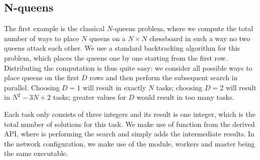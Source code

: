 \documentclass{llncs}
\begin{document}
\subsection{N-queens}\label{sec:n-queens}

The first example is the classical $N$-queens problem, where we
compute the total number of ways to place $N$ queens on a $N\times N$
chessboard in such a way no two queens attack each other.
We use a standard backtracking algorithm for this problem, which
places the queens one by one starting from the first row.
Distributing the computation is thus quite easy: we consider all
possible ways to place queens on the first $D$ rows and then perform
the subsequent search in parallel. Choosing $D=1$ will result in
exactly $N$ tasks; choosing $D=2$ will result in $N^2-3N+2$ tasks; 
greater values for $D$ would result in too many tasks.


Each task only consists of three integers and its result is one integer,
which is the total number of solutions for this task.
We make use of function  from the derived API,
where  is performing the search and  simply adds the
intermediate results.
In the network configuration, we make use of the 
module, workers and master being the same executable.
\end{document}
